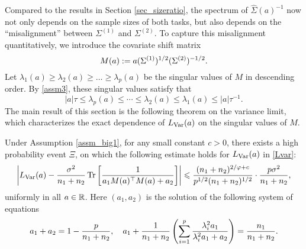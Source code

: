 Compared to the results in Section \ref{sec_sizeratio}, the spectrum of $\hat{\Sigma}(a)^{-1}$ now not only depends on the sample sizes of both tasks, but also depends on the ``misalignment'' between $\Sigma^{(1)}$ and $\Sigma^{(2)}$.
To capture this misalignment quantitatively, we introduce the covariate shift matrix %
$$ M(a) := a(\Sigma^{(1)})^{1/2}(\Sigma^{(2)})^{-1/2}.$$
Let $\lambda_1(a)\ge \lambda_2(a)\ge \dots\ge \lambda_p(a)$ be the singular values of $M$ in descending order. By \eqref{assm3}, these singular values satisfy that
\begin{equation}\label{assm32}
|a| \tau \le  \lambda_p(a) \le \cdots \le \lambda_2(a)\le \lambda_1(a) \le |a|\tau^{-1}. %
\end{equation}
The main result of this section is the following theorem on the variance limit, which characterizes  the exact dependence of $L_{\operatorname{Var}}(a)$ on the singular values of $M$.


\begin{theorem}\label{thm_main_RMT}
Under Assumption \ref{assm_big1}, for any small constant $c>0$, there exists a high probability event $\Xi$, on which the following estimate holds for $L_{\operatorname{Var}}(a)$ in \eqref{Lvar}:
			\begin{align}\label{lem_cov_shift_eq}
				\bigabs{L_{\var}(a)- \frac{\sigma^2}{n_1+n_2}\bigtr{  \frac{1}{a_1 M(a)^\top M(a) + a_2  }  }}
				\le \frac{(n_1+n_2)^{2/\varphi + c}}{p^{1/2} (n_1+n_2)^{1/2}}\cdot\frac{p \sigma^2}{n_1+ n_2}  ,
			\end{align}
			 uniformly in all $a\in \mathbb{R}$. Here $(a_1,a_2)$ is the solution of the following system of equations
			\begin{align}
				a_1 + a_2 = 1- \frac{p}{n_1 + n_2}, \quad
				a_1 + \frac1{n_1 + n_2}  \bigbrace{\sum_{i=1}^p \frac{\lambda_i^2 a_1}{\lambda_i^2 a_1 + a_2}} = \frac{n_1}{n_1 + n_2}. \label{eq_a12extra}
			\end{align}

\end{theorem}


